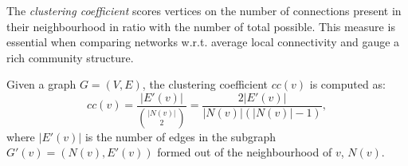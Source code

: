 The \emph{clustering coefficient} scores vertices on the number of connections present in their neighbourhood in ratio with the number of total possible. This measure is essential when comparing networks w.r.t. average local connectivity and gauge a rich community structure.

\begin{definition}
Given a graph $G=(V, E)$, the clustering coefficient $cc(v)$ is computed as: \begin{equation}
cc(v)=\frac{|E'(v)|}{{|N(v)| \choose 2}} = \frac{2|E'(v)|}{|N(v)|(|N(v)|-1)},\end{equation}
where $|E'(v)|$ is the number of edges in the subgraph $G'(v)=(N(v), E'(v))$ formed out of the neighbourhood of $v$, $N(v)$.
\end{definition}





